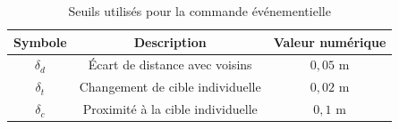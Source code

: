 \vspace{0.5em}
\begin{table}[h!]
    \centering
    \begin{tabular}{|c|c|c|}
        \hline
        \textbf{Symbole} & \textbf{Description} & \textbf{Valeur numérique} \\
        \hline
        $\delta_d$ & Écart de distance avec voisins & $0{,}05$ m \\
        $\delta_t$ & Changement de cible individuelle & $0{,}02$ m \\
        $\delta_c$ & Proximité à la cible individuelle & $0{,}1$ m \\
        \hline
    \end{tabular}
    \caption{Seuils utilisés pour la commande événementielle}
\end{table}